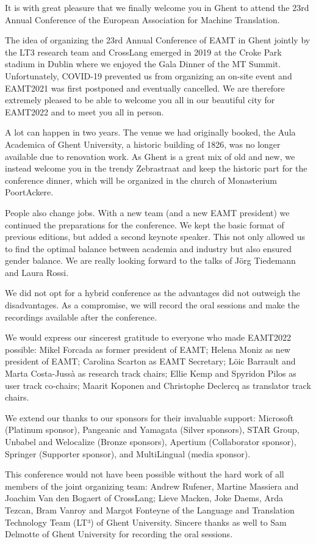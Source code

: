 \documentclass[a4paper,11pt,twoside]{book}
\begin{document}
\begin{onehalfspacing}
It is with great pleasure that we finally welcome you in Ghent to attend the 23rd Annual Conference of the European Association for Machine Translation.
 
The idea of organizing the 23rd Annual Conference of EAMT in Ghent jointly by the LT3 research team and CrossLang emerged in 2019 at the Croke Park stadium in Dublin where we enjoyed the Gala Dinner of the MT Summit. Unfortunately, COVID-19 prevented us from organizing an on-site event and EAMT2021 was first postponed and eventually cancelled. We are therefore extremely pleased to be able to welcome you all in our beautiful city for EAMT2022 and to meet you all in person.
 
A lot can happen in two years. The venue we had originally booked, the Aula Academica of Ghent University, a historic building of 1826, was no longer available due to renovation work. As Ghent is a great mix of old and new, we instead welcome you in the trendy Zebrastraat and keep the historic part for the conference dinner, which will be organized in the church of Monasterium PoortAckere. 
 
People also change jobs. With a new team (and a new EAMT president) we continued the preparations for the conference. We kept the basic format of previous editions, but added a second keynote speaker. This not only allowed us to find the optimal balance between academia and industry but also ensured gender balance. We are really looking forward to the talks of Jörg Tiedemann and Laura Rossi.
 
We did not opt for a hybrid conference as the advantages did not outweigh the disadvantages. As a compromise, we will record the oral sessions and make the recordings available after the conference. 
 
We would express our sincerest gratitude to everyone who made EAMT2022 possible: Mikel Forcada as former president of EAMT; Helena Moniz as new president of EAMT; Carolina Scarton as EAMT Secretary; Löic Barrault and Marta Costa-Jussà as research track chairs; Ellie Kemp and Spyridon Pilos as user track co-chairs; Maarit Koponen and Christophe Declercq as translator track chairs.  
 
We extend our thanks to our sponsors for their invaluable support: Microsoft (Platinum sponsor), Pangeanic and Yamagata (Silver sponsors), STAR Group, Unbabel and Welocalize (Bronze sponsors), Apertium (Collaborator sponsor), Springer (Supporter sponsor), and MultiLingual (media sponsor).
 
This conference would not have been possible without the hard work of all members of the joint organizing team: Andrew Rufener, Martine Massiera and Joachim Van den Bogaert of CrossLang; Lieve Macken, Joke Daems, Arda Tezcan, Bram Vanroy and Margot Fonteyne of the Language and Translation Technology Team (LT³) of Ghent University. Sincere thanks as well to Sam Delmotte of Ghent University for recording the oral sessions.

\end{onehalfspacing}
\end{document}
